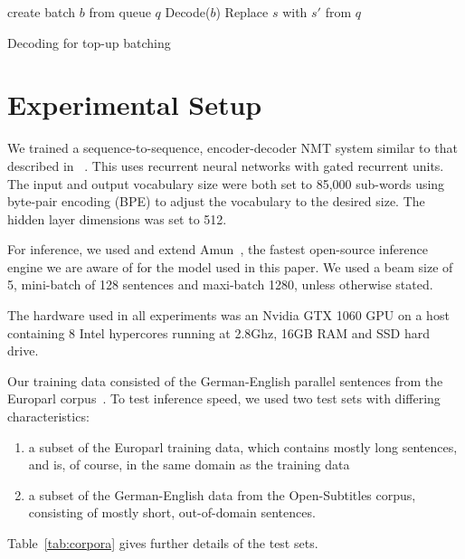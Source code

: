 \documentclass[11pt,a4paper]{article}
\begin{document}
\begin{algorithm}
\begin{algorithmic}


\State create batch $b$ from queue $q$
  \State Decode($b$)
      \State Replace $s$ with $s'$ from $q$
    \EndIf
  \EndFor
\EndWhile

\EndProcedure

\end{algorithmic}
\caption{Decoding for top-up batching}
\label{algo:Decoding for top-up batching}
\end{algorithm}


\section{Experimental Setup}
\label{sec:Experimental Setup}

We trained a sequence-to-sequence, encoder-decoder NMT system similar to that described in ~\cite{sennrich-haddow-birch:2016:P16-12}. This uses recurrent neural networks with gated recurrent units. The input and output vocabulary size were both set to 85,000 sub-words using byte-pair encoding (BPE) to adjust the vocabulary to the desired size. The hidden layer dimensions was set to 512. %

For inference, we used and extend Amun~\citep{junczys2016neural}, the fastest open-source inference engine we are aware of for the model used in this paper. We used a beam size of 5, mini-batch of 128 sentences and maxi-batch 1280, unless otherwise stated.

The hardware used in all experiments was an Nvidia GTX 1060 GPU on a host containing 8 Intel hypercores running at 2.8Ghz, 16GB RAM and SSD hard drive.

Our training data consisted of the German-English parallel sentences from the Europarl corpus~\citep{Koehn:2005:MTS}. To test inference speed, we used two test sets with differing characteristics:
\begin{enumerate}
   \item \vspace{-2 mm} a subset of the Europarl training data, which contains mostly long sentences, and is, of course, in the same domain as the training data
   \item \vspace{-2 mm} a subset of the German-English data from the Open-Subtitles corpus, consisting of mostly short, out-of-domain sentences.
\end{enumerate}
Table~\ref{tab:corpora} gives further details of the test sets.
\end{document}
